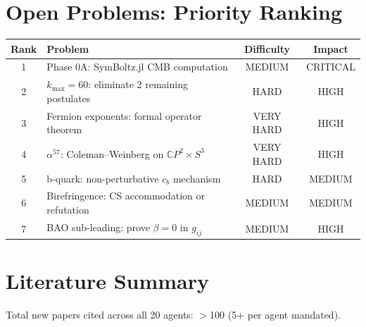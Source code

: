 \documentclass[11pt,a4paper]{article}
\newcommand{\CP}{\mathbb{C}P}
\begin{document}
\section{Open Problems: Priority Ranking}

\begin{center}
\begin{longtable}{clcc}
\toprule
\textbf{Rank} & \textbf{Problem} & \textbf{Difficulty} & \textbf{Impact} \\
\midrule
1 & Phase 0A: SymBoltz.jl CMB computation & MEDIUM & CRITICAL \\
2 & $k_{\max} = 60$: eliminate 2 remaining postulates & HARD & HIGH \\
3 & Fermion exponents: formal operator theorem & VERY HARD & HIGH \\
4 & $\alpha^{57}$: Coleman--Weinberg on $\CP^2 \times S^3$ & VERY HARD & HIGH \\
5 & b-quark: non-perturbative $c_b$ mechanism & HARD & MEDIUM \\
6 & Birefringence: CS accommodation or refutation & MEDIUM & MEDIUM \\
7 & BAO sub-leading: prove $\beta = 0$ in $g_{ij}$ & MEDIUM & HIGH \\
\bottomrule
\end{longtable}
\end{center}


\section{Literature Summary}

Total new papers cited across all 20 agents: $>$100 (5+ per agent mandated).
\end{document}
